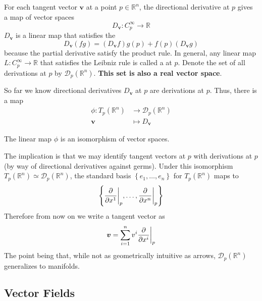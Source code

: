 For each tangent vector \(\bm{v}\) at a point \(p \in \mathbb{R}^n\), the directional derivative at \(p\) gives a map of vector spaces
%
\begin{equation*}
    D_{\bm{v}} \colon C_p^\infty \rightarrow \mathbb{R}
\end{equation*}
%
\(D_{\bm{v}}\) is a linear map that satisfies the 
%
\begin{equation}
    D_{\bm{v}}(fg) = (D_{\bm{v}}f)g(p) + f(p) (D_{\bm{v}}g)
\end{equation}
%
because the partial derivative satisfy the product rule.
%
In general, any linear map \(L\colon C_p^\infty \rightarrow \mathbb{R}\) that satisfies the Leibniz rule is called a  at \(p\).
%
Denote the set of all derivations at \(p\) by \(\mathcal{D}_p(\mathbb{R}^n)\).
%
\textbf{This set is also a real vector space}.
%

So far we know directional derivatives \(D_{\bm{v}}\) at \(p\) are derivations at \(p\).
%
Thus, there is a map
\begin{align*}
    \phi\colon T_p(\mathbb{R}^n) & \rightarrow \mathcal{D}_p (\mathbb{R}^n) \\
    \bm{v}                       & \mapsto D_{\bm{v}}
\end{align*}
%
\begin{theorem}
    The linear map \(\phi\) is an isomorphism of vector spaces.
\end{theorem}
%
\noindent The implication is that we may identify tangent vectors at \(p\) with derivations at \(p\) (by way of directional derivatives against germs).
%
Under this isomorphism \(T_p(\mathbb{R}^n) \simeq \mathcal{D}_p(\mathbb{R}^n)\), the standard basis \(\left\{ e_1, \dots, e_n \right\}\) for \(T_p(\mathbb{R}^n)\) maps to
%
\begin{equation}
    \left\{\evalat[\bigg]{\pdv{}{x^1}}{p}, \dots, \evalat[\bigg]{\pdv{}{x^n}}{p}  \right\}\label{eqn:tangentbasis}
\end{equation}
%
Therefore from now on we write a tangent vector as
%
\begin{equation}
    \bm{v} = \sum_{i=1}^{n} v^i \evalat[\bigg]{\pdv{}{x^i}}{p}
\end{equation}
%
The point being that, while not as geometrically intuitive as arrows, \(\mathcal{D}_p (\mathbb{R}^n)\) generalizes to manifolds.

\subsection{Vector Fields}

